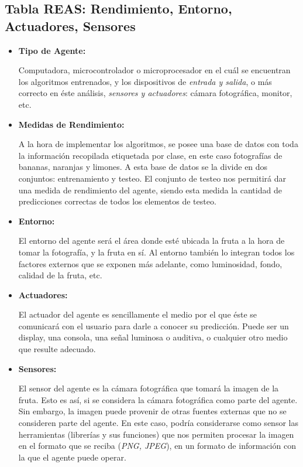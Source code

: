 \documentclass[10pt,a4paper]{article}
\begin{document}
\subsection{Tabla REAS: Rendimiento, Entorno, Actuadores, Sensores}
\begin{itemize}
\item \textbf{Tipo de Agente:}

Computadora, microcontrolador o microprocesador en el cuál se encuentran los algoritmos entrenados, y los dispositivos de \textit{entrada y salida}, o más correcto en éste análisis, \textit{sensores y actuadores}: cámara fotográfica, monitor, etc.

\item \textbf{Medidas de Rendimiento:}

A la hora de implementar los algoritmos, se posee una base de datos con toda la información recopilada etiquetada por clase, en este caso fotografías de bananas, naranjas y limones. A esta base de datos se la divide en dos conjuntos: entrenamiento y testeo. El conjunto de testeo nos permitirá dar una medida de rendimiento del agente, siendo esta medida la cantidad de predicciones correctas de todos los elementos de testeo.

\item \textbf{Entorno:}

El entorno del agente será el área donde esté ubicada la fruta a la hora de tomar la fotografía, y la fruta en sí. Al entorno también lo integran todos los factores externos que se exponen más adelante, como luminosidad, fondo, calidad de la fruta, etc.

\item \textbf{Actuadores:}

El actuador del agente es sencillamente el medio por el que éste se comunicará con el usuario para darle a conocer su predicción. Puede ser un display, una consola, una señal luminosa o auditiva, o cualquier otro medio que resulte adecuado.

\item \textbf{Sensores:}

El sensor del agente es la cámara fotográfica que tomará la imagen de la fruta. Esto es así, si se considera la cámara fotográfica como parte del agente. Sin embargo, la imagen puede provenir de otras fuentes externas que no se consideren parte del agente. En este caso, podría considerarse como sensor las herramientas (librerías y sus funciones) que nos permiten procesar la imagen en el formato que se reciba (\textit{PNG, JPEG}), en un formato de información con la que el agente puede operar.

\end{itemize}
 
\end{document}
